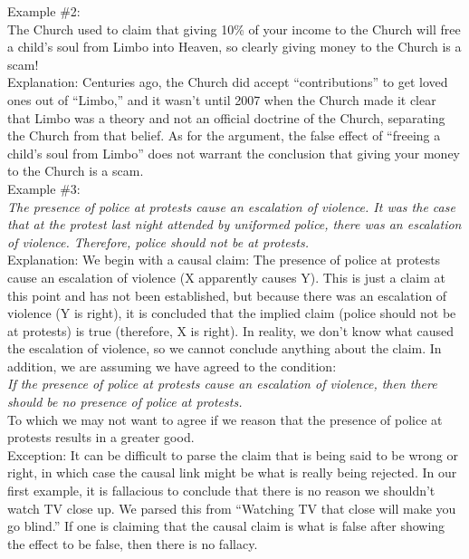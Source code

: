 \documentclass[a4paper,12pt,single,pdftex]{scrartcl}
\begin{document}
    
      Example \#2:
    \\

    
      The Church used to claim that giving 10\% of your income to the Church will free a child’s soul from Limbo into Heaven, so clearly giving money to the Church is a scam!
    \\

    
      Explanation: Centuries ago, the Church did accept “contributions” to get loved ones out of “Limbo,” and it wasn’t until 2007 when the Church made it clear that Limbo was a theory and not an official doctrine of the Church, separating the Church from that belief. As for the argument, the false effect of “freeing a child’s soul from Limbo” does not warrant the conclusion that giving your money to the Church is a scam.
    \\

    
      Example \#3: 
    \\

    
      {\em The presence of police at protests cause an escalation of violence. It was the case that at the protest last night attended by uniformed police, there was an escalation of violence. Therefore, police should not be at protests.}
    \\

    
      Explanation: We begin with a causal claim: The presence of police at protests cause an escalation of violence (X apparently causes Y). This is just a claim at this point and has not been established, but because there was an escalation of violence (Y is right), it is concluded that the implied claim (police should not be at protests) is true (therefore, X is right). In reality, we don’t know what caused the escalation of violence, so we cannot conclude anything about the claim. In addition, we are assuming we have agreed to the condition:
    \\

    
      {\em If the presence of police at protests cause an escalation of violence, then there should be no presence of police at protests.}
    \\

    
      To which we may not want to agree if we reason that the presence of police at protests results in a greater good.
    \\

    
      Exception: It can be difficult to parse the claim that is being said to be wrong or right, in which case the causal link might be what is really being rejected. In our first example, it is fallacious to conclude that there is no reason we shouldn’t watch TV close up. We parsed this from “Watching TV that close will make you go blind.” If one is claiming that the causal claim is what is false after showing the effect to be false, then there is no fallacy.
    \\
\end{document}
